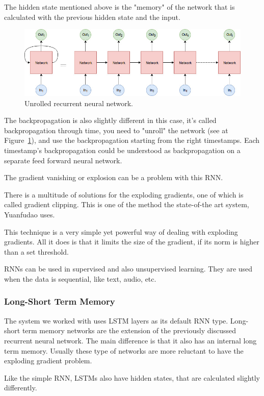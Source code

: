 The hidden state mentioned above is the "memory" of the network that is calculated with the previous hidden state and the input.

\begin{figure}[!ht]
	\centering
	\includegraphics[width=150mm, keepaspectratio]{figures/unrolled.jpg}
	\caption{Unrolled recurrent neural network.}
	\label{fig:unrolled}
\end{figure}

The backpropagation is also slightly different in this case, it's called backpropagation through time, you need to "unroll" the network (see at Figure~\ref{fig:unrolled}), and use the backpropagation starting from the right timestamps. Each timestamp's backpropagation could be understood as backpropagation on a separate feed forward neural network.

The gradient vanishing or explosion can be a problem with this RNN.

There is a multitude of solutions for the exploding gradients, one of which is called gradient clipping. This is one of the method the state-of-the art system, Yuanfudao uses.

This technique is a very simple yet powerful way of dealing with exploding gradients. All it does is that it limits the size of the gradient, if its norm is higher than a set threshold.

RNNs can be used in supervised and also unsupervised learning. They are used when the data is sequential, like text, audio, etc.

\subsubsection{Long-Short Term Memory}
The system we worked with uses LSTM layers as its default RNN type.
Long-short term memory networks are the extension of the previously discussed recurrent neural network. The main difference is that it also has an internal long term memory. Usually these type of networks are more reluctant to have the exploding gradient problem.

Like the simple RNN, LSTMs also have hidden states, that are calculated slightly differently.
\\

